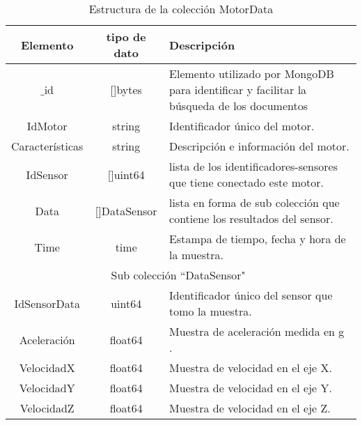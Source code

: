     \begin{table}[ht]
        \begin{center}
        \caption[Estructura de MotorData]{Estructura de la colección MotorData}
        \label{tab:MotorDatabson}

            \vspace{0.3cm}
            \begin{tabular}{|c|c|p{9cm}|}
                \hline
                Elemento        & tipo de dato & Descripción \\\hline\hline
                $\_$id      & []bytes  & Elemento utilizado por MongoDB para
                identificar y facilitar la búsqueda de los documentos\\\hline
                IdMotor         & string   & Identificador único del motor.\\\hline
                Características & string   & Descripción e información del motor.\\\hline
                IdSensor        & []uint64 & lista de los identificadores-sensores
                que tiene conectado este motor.\\\hline
                Data            & []DataSensor & lista en forma de sub colección
                que contiene los resultados del sensor.\\\hline
                Time            & time  & Estampa de tiempo, fecha y hora de la muestra.\\\hline
                \hline
                \multicolumn{3}{|c|}{Sub colección  ``DataSensor"\ }\\\hline\hline
                IdSensorData & uint64 & Identificador único del sensor que tomo la muestra.\\\hline
                Aceleración  & float64 & Muestra de aceleración medida en g .\\\hline
                VelocidadX & float64 & Muestra de velocidad en el eje X.\\\hline
                VelocidadY & float64 & Muestra de velocidad en el eje Y.\\\hline
                VelocidadZ & float64 & Muestra de velocidad en el eje Z.\\
                \hline
            \end{tabular}
        \end{center}
    \end{table}

